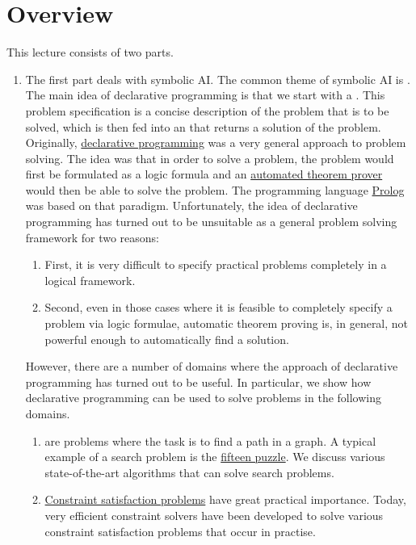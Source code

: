 \section{Overview}
This lecture consists of two parts.
\begin{enumerate}
\item The first part deals with symbolic AI.
      The common theme of symbolic AI is .  
      The main idea of declarative programming is that we start with a .
      This problem specification is a concise description of the problem that is to be solved, which is
      then fed into an  that returns a solution of the problem.  Originally, 
      \href{https://en.wikipedia.org/wiki/Declarative_programming}{declarative programming} was a very general
      approach to problem solving.  The idea was that in order to solve a problem, the problem would first be
      formulated as a logic formula and an
      \href{https://en.wikipedia.org/wiki/Automated_theorem_proving}{automated theorem prover} would then be
      able to solve the problem.  The programming language \href{https://en.wikipedia.org/wiki/Prolog}{Prolog}
      was based on that paradigm.  Unfortunately, the idea of declarative programming has
      turned out to be unsuitable as a general problem solving framework for two reasons:
      \begin{enumerate}
      \item First, it is very difficult to specify practical problems completely in a logical framework.
      \item Second, even in those cases where it is feasible to completely specify a problem via logic formulae,
            automatic theorem proving is, in general, not powerful enough to automatically find a solution. 
      \end{enumerate}
      However, there are a number of domains where the approach of declarative programming has turned out to be
      useful.  In particular, we show how declarative programming can be used to solve problems in the
      following domains.
      \begin{enumerate}
      \item {} are problems where the task is to find a path in a graph.  A typical example of a
            search problem is the \href{https://en.wikipedia.org/wiki/15_puzzle}{fifteen puzzle}.
            We discuss various state-of-the-art algorithms that can solve search problems.
      \item \href{https://en.wikipedia.org/wiki/Constraint_satisfaction_problem}{Constraint satisfaction problems} 
            have great practical importance.  Today, very efficient constraint solvers have been developed to
            solve various constraint satisfaction problems that occur in practise.


\end{enumerate}
\end{enumerate}
